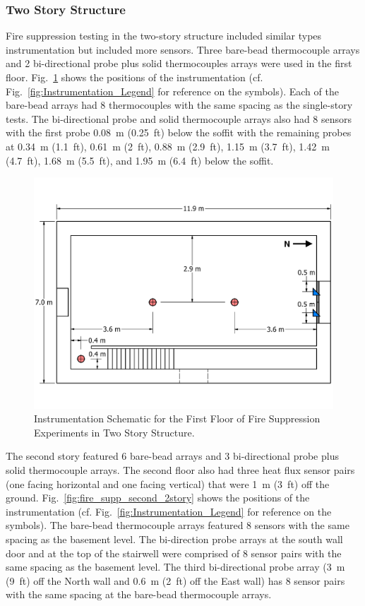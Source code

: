 \documentclass[12pt,oneside]{book}
\begin{document}
\subsubsection*{Two Story Structure}

Fire suppression testing in the two-story structure included similar types instrumentation but included more sensors. Three bare-bead thermocouple arrays and 2 bi-directional probe plus solid thermocouples arrays were used in the first floor. Fig.~\ref{fig:fire_supp_first_2story} shows the positions of the instrumentation (cf. Fig.~\ref{fig:Instrumentation_Legend} for reference on the symbols). Each of the bare-bead arrays had 8 thermocouples with the same spacing as the single-story tests. The bi-directional probe and solid thermocouple arrays also had 8 sensors with the first probe 0.08~m (0.25~ft) below the soffit with the remaining probes at 0.34~m (1.1~ft), 0.61~m (2~ft), 0.88~m (2.9~ft), 1.15~m (3.7~ft), 1.42~m (4.7~ft), 1.68~m (5.5~ft), and 1.95~m (6.4~ft) below the soffit.

\begin{figure}[!ht]
	\includegraphics[width=\columnwidth]{../../DelCo_2014_2015/Drawings/PDFs/CAFS/West_Structure_1st_Floor_Instrumentation}
	\caption{Instrumentation Schematic for the First Floor of Fire Suppression Experiments in Two Story Structure.}
	\label{fig:fire_supp_first_2story}
\end{figure}

The second story featured 6 bare-bead arrays and 3 bi-directional probe plus solid thermocouple arrays. The second floor also had three heat flux sensor pairs (one facing horizontal and one facing vertical) that were 1~m (3~ft) off the ground. Fig.~\ref{fig:fire_supp_second_2story} shows the positions of the instrumentation (cf. Fig.~\ref{fig:Instrumentation_Legend} for reference on the symbols). The bare-bead thermocouple arrays featured 8 sensors with the same spacing as the basement level. The bi-direction probe arrays at the south wall door and at the top of the stairwell were comprised of 8 sensor pairs with the same spacing as the basement level. The third bi-directional probe array (3~m (9~ft) off the North wall and 0.6~m (2~ft) off the East wall) has 8 sensor pairs with the same spacing at the bare-bead thermocouple arrays.
\end{document}
